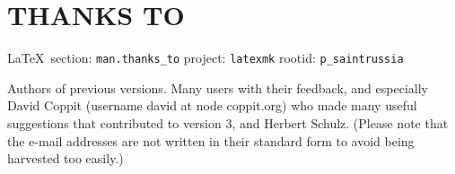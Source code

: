  
 

\section{THANKS TO}

\vspace{0.5cm}
 {\ifDEBUG\small\LaTeX~section: \verb|man.thanks_to| project: \verb|latexmk| rootid: \verb|p_saintrussia| \fi}
\vspace{0.5cm}

Authors  of previous versions.  Many users with their feedback, and especially
David Coppit (username david at node coppit.org) who made many useful
suggestions  that contributed to version 3, and Herbert Schulz.  (Please note
that the e-mail addresses are not written in  their  standard form to avoid
being harvested too easily.)
 
